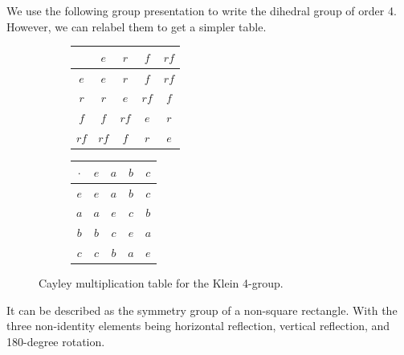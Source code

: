   \begin{example}
    \label{ex:dihedral-group-of-order-4-aka-klein-4-group}
    We use the following group presentation to write the dihedral group of order 4. However, we can relabel them to get a simpler table. 

    \begin{figure}[H]
      \centering
      \begin{subfigure}[b]{0.48\textwidth}
        \centering
        \begin{tabular}{|c|c|c|c|c|}
          \hline
          & $e$ & $r$ & $f$ & $rf$ \\
          \hline
          $e$ & $e$ & $r$ & $f$ & $rf$ \\
          \hline
          $r$ & $r$ & $e$ & $rf$ & $f$ \\
          \hline
          $f$ & $f$ & $rf$ & $e$ & $r$ \\
          \hline
          $rf$ & $rf$ & $f$ & $r$ & $e$ \\
          \hline
        \end{tabular}
      \end{subfigure}
      \hfill 
      \begin{subfigure}[b]{0.48\textwidth}
        \centering 
        \begin{tabular}{c|cccc}
          \hline
          $\cdot$ & $e$ & $a$ & $b$ & $c$ \\
          \hline
          $e$ & $e$ & $a$ & $b$ & $c$ \\
          $a$ & $a$ & $e$ & $c$ & $b$ \\
          $b$ & $b$ & $c$ & $e$ & $a$ \\
          $c$ & $c$ & $b$ & $a$ & $e$ \\
          \hline
        \end{tabular}
      \end{subfigure}
      \caption{Cayley multiplication table for the Klein 4-group.}
      \label{fig:dihedral_order4}
    \end{figure}

    It can be described as the symmetry group of a non-square rectangle. With the three non-identity elements being horizontal reflection, vertical reflection, and 180-degree rotation. 
  \end{example}

